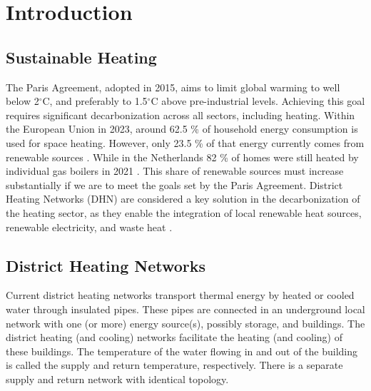 %
\chapter{Introduction} \label{chap::intro}
\section{Sustainable Heating}
The Paris Agreement, adopted in 2015, aims to limit global warming to well below 2$^{\circ}\text{C}$, and preferably to 1.5$^{\circ}\text{C}$ above pre-industrial levels. Achieving this goal requires significant decarbonization across all sectors, including heating. Within the European Union in 2023, around 62.5 \% of household energy consumption is used for space heating. However, only 23.5 \% of that energy currently comes from renewable sources \cite{EUenergie}. While in the Netherlands 82 \% of homes were still heated by individual gas boilers in 2021 \cite{NLenergie}.
This share of renewable sources must increase substantially if we are to meet the goals set by the Paris Agreement. District Heating Networks (DHN) are considered a key solution in the decarbonization of the heating sector, as they enable the integration of local renewable heat sources, renewable electricity, and waste heat \cite{KUNTUAROVA}.


\section{District Heating Networks}
Current district heating networks transport thermal energy by heated or cooled water through insulated pipes. These pipes are connected in an underground local network with one (or more) energy source(s), possibly storage, and buildings. The district heating (and cooling) networks facilitate the heating (and cooling) of these buildings. The temperature of the water flowing in and out of the building is called the supply and return temperature, respectively. There is a separate supply and return network with identical topology. 

